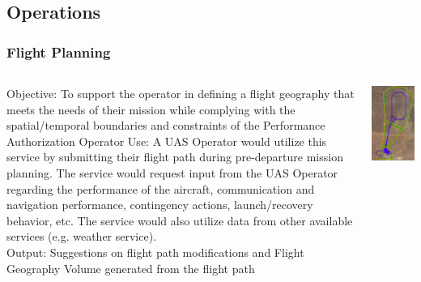 \documentclass[usenames,dvipsnames,aspectratio=169,serif]{beamer}
\begin{document}
\subsection{Operations}
\begin{frame}
   \frametitle{Flight Planning}
   \begin{columns}[T]
      \begin{column}{0.75\textwidth}
         {Objective: To support the operator in defining a flight geography that meets the needs of their mission while complying with the spatial/temporal boundaries and constraints of the Performance Authorization}
         Operator Use: A UAS Operator would utilize this service by submitting their flight path during pre-departure mission planning. The service would request input from the UAS Operator regarding the performance of the aircraft, communication and navigation performance, contingency actions, launch/recovery behavior, etc. The service would also utilize data from other available services (e.g. weather service). \\
         Output: Suggestions on flight path modifications and Flight Geography Volume generated from the flight path
      \end{column}
      \begin{column}{0.25\textwidth}
         \includegraphics[height=0.75\textheight]{img/flight-planning.png}

\end{column}
\end{columns}
\end{frame}
\end{document}
